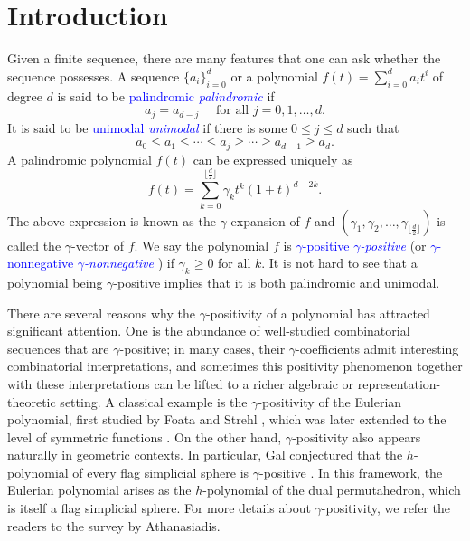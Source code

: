 \documentclass[reqno]{amsart}
\newcommand{\defin}[1]{%
\relax\ifmmode%
\textcolor{blue}{#1}%
\else\textcolor{blue}{\emph{#1}}%
\fi%
}
\theoremstyle{definition}
\theoremstyle{remark}
\begin{document}
\section{Introduction}
Given a finite sequence, there are many features that one can ask whether the sequence possesses. A sequence $\{a_i\}_{i=0}^d$ or a polynomial $f(t)=\sum_{i=0}^d a_i t^i$ of degree $d$ is said to be \defin{palindromic} if 
\[
    a_j=a_{d-j}\quad \text{ for all } j=0,1,\ldots, d.
\]
It is said to be \defin{unimodal} if there is some $0\le j\le d$ such that 
\[
    a_0\le a_1\le\cdots\le a_j\ge\cdots\ge a_{d-1}\ge a_d.
\]
A palindromic polynomial $f(t)$ can be expressed uniquely as 
\[
    f(t)=\sum_{k=0}^{\lfloor\frac{d}{2}\rfloor}\gamma_{k}t^k(1+t)^{d-2k}.
\]
The above expression is known as the $\gamma$-expansion of $f$ and $(\gamma_1,\gamma_2,\ldots, \gamma_{\lfloor\frac{d}{2}\rfloor})$ is called the $\gamma$-vector of $f$.
We say the polynomial $f$ is \defin{$\gamma$-positive} (or \defin{$\gamma$-nonnegative}) if $\gamma_k\ge 0$ for all $k$. 
It is not hard to see that a polynomial being $\gamma$-positive implies that it is both palindromic and unimodal. 

There are several reasons why the $\gamma$-positivity of a polynomial has attracted significant attention. One is the abundance of well-studied combinatorial sequences that are $\gamma$-positive; in many cases, their $\gamma$-coefficients admit interesting combinatorial interpretations, and sometimes this positivity phenomenon together with these interpretations can be lifted to a richer algebraic or representation-theoretic setting. A classical example is the $\gamma$-positivity of the Eulerian polynomial, first studied by Foata and Strehl \cite{FoataStrehl1974}, which was later extended to the level of symmetric functions \cite{ShareshianWachs2010,ShareshianWachs2020}.
On the other hand, $\gamma$-positivity also appears naturally in geometric contexts. In particular, Gal conjectured that the $h$-polynomial of every flag simplicial sphere is $\gamma$-positive \cite[Conjecture 2.1.7]{Gal2005}.
In this framework, the Eulerian polynomial arises as the $h$-polynomial of the dual permutahedron, which is itself a flag simplicial sphere.
For more details about $\gamma$-positivity, we refer the readers to the survey \cite{AthanasiadisGamma} by Athanasiadis.
\end{document}
